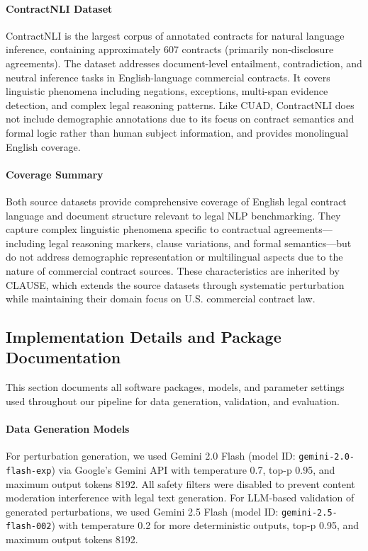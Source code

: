 \documentclass[11pt]{article}
\newcommand{\datasetName}{{\sc CLAUSE}\xspace}
\begin{document}
\paragraph{ContractNLI Dataset} ContractNLI is the largest corpus of annotated contracts for natural language inference, containing approximately 607 contracts (primarily non-disclosure agreements). The dataset addresses document-level entailment, contradiction, and neutral inference tasks in English-language commercial contracts. It covers linguistic phenomena including negations, exceptions, multi-span evidence detection, and complex legal reasoning patterns. Like CUAD, ContractNLI does not include demographic annotations due to its focus on contract semantics and formal logic rather than human subject information, and provides monolingual English coverage.

\paragraph{Coverage Summary} Both source datasets provide comprehensive coverage of English legal contract language and document structure relevant to legal NLP benchmarking. They capture complex linguistic phenomena specific to contractual agreements—including legal reasoning markers, clause variations, and formal semantics—but do not address demographic representation or multilingual aspects due to the nature of commercial contract sources. These characteristics are inherited by \datasetName, which extends the source datasets through systematic perturbation while maintaining their domain focus on U.S. commercial contract law.
\subsection{Implementation Details and Package Documentation}
\label{sec:implementation-packages}

This section documents all software packages, models, and parameter settings used throughout our pipeline for data generation, validation, and evaluation.

\paragraph{Data Generation Models} For perturbation generation, we used Gemini 2.0 Flash (model ID: \texttt{gemini-2.0-flash-exp}) via Google's Gemini API with temperature 0.7, top-p 0.95, and maximum output tokens 8192. All safety filters were disabled to prevent content moderation interference with legal text generation. For LLM-based validation of generated perturbations, we used Gemini 2.5 Flash (model ID: \texttt{gemini-2.5-flash-002}) with temperature 0.2 for more deterministic outputs, top-p 0.95, and maximum output tokens 8192.
\end{document}

